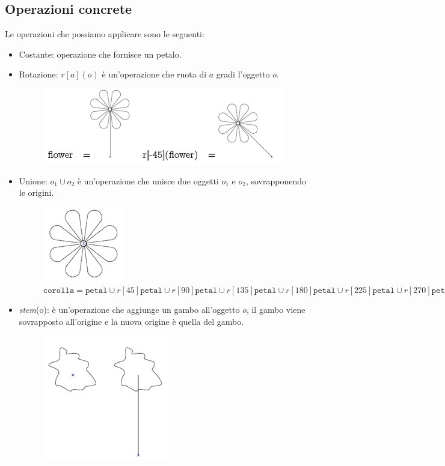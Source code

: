\subsection{Operazioni concrete}
Le operazioni che possiamo applicare sono le seguenti:
\begin{itemize}
    \item Costante: operazione che fornisce un petalo.
    \item Rotazione: $r[a](o)$ è un'operazione che ruota di $a$ gradi l'oggetto $o$.
    \begin{figure}[H]
        \centering 
        \includegraphics[scale=0.5]{img/rotation.png}
    \end{figure}
    \item Unione: $o_1 \cup o_2$ è un'operazione che unisce due oggetti $o_1$ e $o_2$, sovrapponendo 
    le origini.
    \begin{figure}[H]
        \centering 
        \includegraphics[scale=0.5]{img/corolla.png}
        \caption{$\texttt{corolla} = \texttt{petal} \cup r[45]\texttt{petal} 
        \cup r[90]\texttt{petal} \cup r[135]\texttt{petal}
        \cup r[180]\texttt{petal} \cup r[225]\texttt{petal} 
        \cup r[270]\texttt{petal} \cup r[315]\texttt{petal}$}
    \end{figure}
    \item \textit{stem}(o): è un'operazione che aggiunge un gambo all'oggetto $o$, il gambo viene sovrapposto 
    all'origine e la nuova origine è quella del gambo.
    \begin{figure}[H]
        \centering 
        \includegraphics[scale=0.5]{img/stem.png}
    \end{figure}
\end{itemize}
